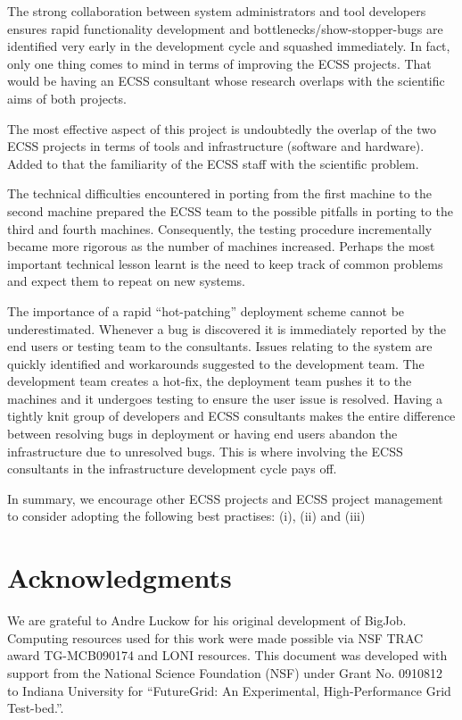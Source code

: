 \documentclass{sig-alternate}
\begin{document}



The strong collaboration between system administrators and tool
developers ensures rapid functionality development and
bottlenecks/show-stopper-bugs are identified very early in the
development cycle and squashed immediately. In fact, only one thing
comes to mind in terms of improving the ECSS projects. That would be
having an ECSS consultant whose research overlaps with the scientific
aims of both projects. 

The most effective aspect of this project is undoubtedly the overlap
of the two ECSS projects in terms of tools and infrastructure
(software and hardware).  Added to that the familiarity of the ECSS
staff with the scientific problem.

The technical difficulties encountered in porting from the first
machine to the second machine prepared the ECSS team to the possible
pitfalls in porting to the third and fourth machines. Consequently,
the testing procedure incrementally became more rigorous as the number
of machines increased. Perhaps the most important technical lesson
learnt is the need to keep track of common problems and expect them to
repeat on new systems.

The importance of a rapid ``hot-patching'' deployment scheme cannot be
underestimated. Whenever a bug is discovered it is immediately
reported by the end users or testing team to the consultants. Issues
relating to the system are quickly identified and workarounds
suggested to the development team. The development team creates a
hot-fix, the deployment team pushes it to the machines and it
undergoes testing to ensure the user issue is resolved. Having a
tightly knit group of developers and ECSS consultants makes the entire
difference between resolving bugs in deployment or having end users
abandon the infrastructure due to unresolved bugs. This is where
involving the ECSS consultants in the infrastructure development cycle
pays off.

In summary, we encourage other ECSS projects and ECSS project
management to consider adopting the following best practises: (i),
(ii) and (iii) 

\section{Acknowledgments}
We are grateful to Andre Luckow for his original development of
BigJob.  Computing resources used for this work were made possible via
NSF TRAC award TG-MCB090174 and LONI resources.  This document was
developed with support from the National Science Foundation (NSF)
under Grant No.  0910812 to Indiana University for ``FutureGrid: An
Experimental, High-Performance Grid Test-bed.''.



\end{document}
